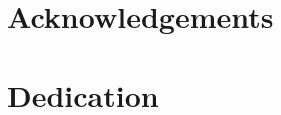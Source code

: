 \documentclass[letterpaper,12pt]{memoir} %
\begin{document}
\newpage
\listoffigures
\newpage
\listoftables

\newpage
\chapter*{Acknowledgements} %
\newpage
\chapter*{Dedication} %



\mainmatter




\SingleSpacing %
\printbibliography %
\end{document}
